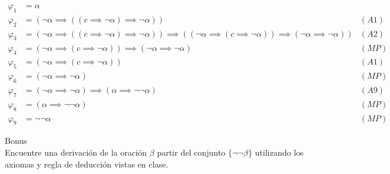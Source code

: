 \begin{sol}
    \begin{align*}
        \varphi_1 & = \alpha                                                                                                                                                                           \\
        \varphi_2 & = (\neg \alpha \implies ((c \implies \neg \alpha )\implies \neg \alpha))                                                                                                    & (A1) \\
        \varphi_3 & = (\neg \alpha \implies ((c \implies \neg \alpha)\implies \neg \alpha))\implies ((\neg \alpha \implies (c \implies \neg \alpha))\implies(\neg \alpha \implies \neg \alpha)) & (A2) \\
        \varphi_4 & = (\neg \alpha \implies (c \implies \neg \alpha))\implies (\neg \alpha \implies \neg \alpha)                                                                                & (MP) \\
        \varphi_5 & = (\neg \alpha \implies (c \implies \neg \alpha))                                                                                                                           & (A1) \\
        \varphi_6 & = (\neg \alpha \implies \neg \alpha)                                                                                                                                        & (MP) \\
        \varphi_7 & = (\neg \alpha \implies \neg \alpha) \implies (\alpha \implies \neg \neg \alpha)                                                                                            & (A9) \\
        \varphi_8 & = (\alpha \implies \neg \neg \alpha)                                                                                                                                        & (MP) \\
        \varphi_9 & = \neg \neg \alpha                                                                                                                                                          & (MP)
    \end{align*}
\end{sol}

\begin{prob}
    Bonus
    \\
    Encuentre una derivación de la oración $\beta$  partir del conjunto $\{\neg \neg \beta\}$ utilizando los axiomas y regla de deducción vistas en clase.
\end{prob}

